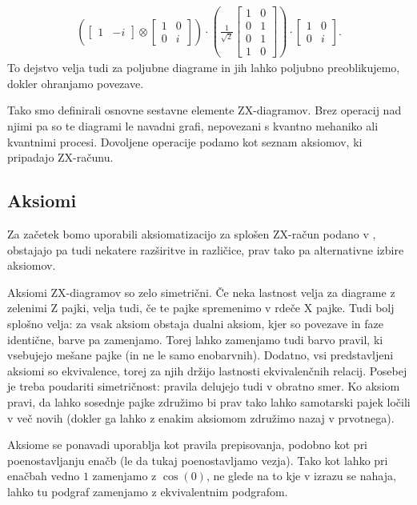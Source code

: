 \documentclass[mat1]{fmfdelo}
\begin{document}
\begin{align*}
    \left(\begin{bmatrix}
        1&-i
    \end{bmatrix}\otimes\begin{bmatrix}
        1&0\\0&i
    \end{bmatrix}\right)\cdot \left(\frac{1}{\sqrt2}\begin{bmatrix}
        1&0\\
        0&1\\
        0&1\\
        1&0
    \end{bmatrix}\right) \cdot \begin{bmatrix}
        1&0\\0&i
    \end{bmatrix}.
\end{align*}
To dejstvo velja tudi za poljubne diagrame in jih lahko poljubno preoblikujemo, dokler ohranjamo povezave.

Tako smo definirali osnovne sestavne elemente ZX-diagramov. Brez operacij nad njimi pa so te diagrami le navadni grafi, nepovezani s kvantno mehaniko ali kvantnimi procesi. Dovoljene operacije podamo kot seznam aksiomov, ki pripadajo ZX-računu.
\subsection{Aksiomi}
Za začetek bomo uporabili aksiomatizacijo za splošen ZX-račun podano v \cite[poglavje 2.2]{vilmart}, obstajajo pa tudi nekatere razširitve in različice, prav tako pa alternativne izbire aksiomov.

Aksiomi ZX-diagramov so zelo simetrični. Če neka lastnost velja za diagrame z zelenimi Z pajki, velja tudi, če te pajke spremenimo v rdeče X pajke. Tudi bolj splošno velja: za vsak aksiom obstaja dualni aksiom, kjer so povezave in faze identične, barve pa zamenjamo. Torej lahko zamenjamo tudi barvo pravil, ki vsebujejo mešane pajke (in ne le samo enobarvnih). Dodatno, vsi predstavljeni aksiomi so ekvivalence, torej za njih držijo lastnosti ekvivalenčnih relacij. Posebej je treba poudariti simetričnost: pravila delujejo tudi v obratno smer. Ko aksiom pravi, da lahko sosednje pajke združimo bi prav tako lahko samotarski pajek ločili v več novih (dokler ga lahko z enakim aksiomom združimo nazaj v prvotnega).

Aksiome se ponavadi uporablja kot pravila prepisovanja, podobno kot pri poenostavljanju enačb (le da tukaj poenostavljamo vezja). Tako kot lahko pri enačbah vedno \(1\) zamenjamo z \(\cos(0)\), ne glede na to kje v izrazu se nahaja, lahko tu podgraf zamenjamo z ekvivalentnim podgrafom.
\end{document}
